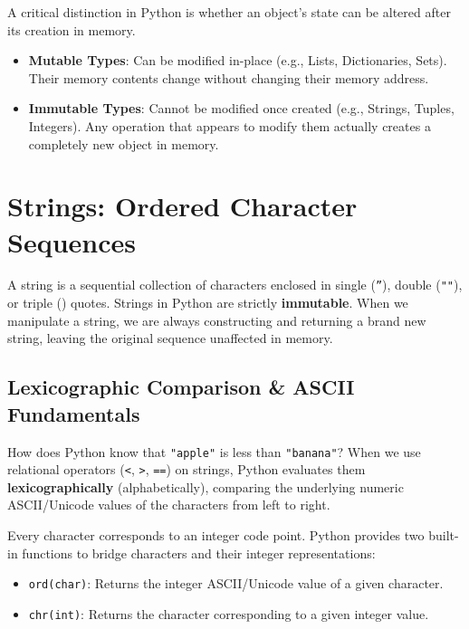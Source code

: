 \begin{conceptbox}
A critical distinction in Python is whether an object's state can be altered after its creation in memory.
\begin{itemize}
    \item \textbf{Mutable Types}: Can be modified in-place (e.g., Lists, Dictionaries, Sets). Their memory contents change without changing their memory address.
    \item \textbf{Immutable Types}: Cannot be modified once created (e.g., Strings, Tuples, Integers). Any operation that appears to modify them actually creates a completely new object in memory.
\end{itemize}
\end{conceptbox}

\section{Strings: Ordered Character Sequences}

A string is a sequential collection of characters enclosed in single (\texttt{''}), double (\texttt{""}), or triple (\texttt{}) quotes. Strings in Python are strictly \textbf{immutable}. When we manipulate a string, we are always constructing and returning a brand new string, leaving the original sequence unaffected in memory.

\subsection{Lexicographic Comparison \& ASCII Fundamentals}
\label{sec:lexicographic}

How does Python know that \texttt{"apple"} is less than \texttt{"banana"}? When we use relational operators (\texttt{<}, \texttt{>}, \texttt{==}) on strings, Python evaluates them \textbf{lexicographically} (alphabetically), comparing the underlying numeric ASCII/Unicode values of the characters from left to right.

Every character corresponds to an integer code point. Python provides two built-in functions to bridge characters and their integer representations:
\begin{itemize}
    \item \texttt{ord(char)}: Returns the integer ASCII/Unicode value of a given character.
    \item \texttt{chr(int)}: Returns the character corresponding to a given integer value.
\end{itemize}

